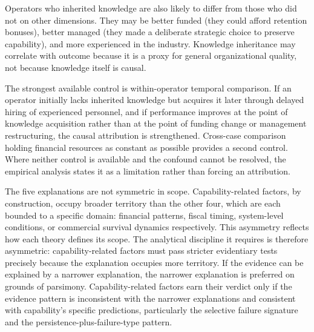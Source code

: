 \documentclass[twoside,fontset=lmodern]{mitthesis}
\begin{document}
Operators who inherited knowledge are also likely to differ from those
who did not on other dimensions. They may be better funded (they could
afford retention bonuses), better managed (they made a deliberate
strategic choice to preserve capability), and more experienced in the
industry. Knowledge inheritance may correlate with outcome because it is
a proxy for general organizational quality, not because knowledge itself
is causal.

The strongest available control is within-operator temporal comparison.
If an operator initially lacks inherited knowledge but acquires it later
through delayed hiring of experienced personnel, and if performance
improves at the point of knowledge acquisition rather than at the point
of funding change or management restructuring, the causal attribution is
strengthened. Cross-case comparison holding financial resources as
constant as possible provides a second control. Where neither control is
available and the confound cannot be resolved, the empirical analysis
states it as a limitation rather than forcing an attribution.

The five explanations are not symmetric in scope. Capability-related
factors, by construction, occupy broader territory than the other four,
which are each bounded to a specific domain: financial patterns, fiscal
timing, system-level conditions, or commercial survival dynamics
respectively. This asymmetry reflects how each theory defines its scope.
The analytical discipline it requires is therefore asymmetric:
capability-related factors must pass stricter evidentiary tests
precisely because the explanation occupies more territory. If the
evidence can be explained by a narrower explanation, the narrower
explanation is preferred on grounds of parsimony. Capability-related
factors earn their verdict only if the evidence pattern is inconsistent
with the narrower explanations and consistent with capability's specific
predictions, particularly the selective failure signature and the
persistence-plus-failure-type pattern.
\end{document}
